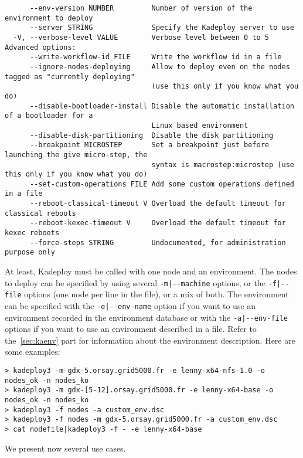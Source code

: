 \documentclass[a4wide,10pt,oneside]{book}
\begin{document}
\begin{small}
\begin{verbatim}
      --env-version NUMBER         Number of version of the environment to deploy
      --server STRING              Specify the Kadeploy server to use
  -V, --verbose-level VALUE        Verbose level between 0 to 5
Advanced options:
      --write-workflow-id FILE     Write the workflow id in a file
      --ignore-nodes-deploying     Allow to deploy even on the nodes tagged as "currently deploying"
                                   (use this only if you know what you do)
      --disable-bootloader-install Disable the automatic installation of a bootloader for a
                                   Linux based environment
      --disable-disk-partitioning  Disable the disk partitioning
      --breakpoint MICROSTEP       Set a breakpoint just before launching the give micro-step, the
                                   syntax is macrostep:microstep (use this only if you know what you do)
      --set-custom-operations FILE Add some custom operations defined in a file
      --reboot-classical-timeout V Overload the default timeout for classical reboots
      --reboot-kexec-timeout V     Overload the default timeout for kexec reboots
      --force-steps STRING         Undocumented, for administration purpose only

\end{verbatim}
\end{small}

At least, Kadeploy must be called with one node and an environment. The nodes to deploy can be specified by using several \texttt{-m|-{}-machine} options, or the \texttt{-f|-{}-file} options (one node per line in the file), or a mix of both.
The environment can be specified with the \texttt{-e|-{}-env-name} option if you want to use an environment recorded in the environment database or with the \texttt{-a|-{}-env-file} options if you want to use an environment described in a file. Refer to the~\ref{sec:kaenv} part for information about the environment description. Here are some examples:
\begin{verbatim}
> kadeploy3 -m gdx-5.orsay.grid5000.fr -e lenny-x64-nfs-1.0 -o nodes_ok -n nodes_ko
> kadeploy3 -m gdx-[5-12].orsay.grid5000.fr -e lenny-x64-base -o nodes_ok -n nodes_ko
> kadeploy3 -f nodes -a custom_env.dsc
> kadeploy3 -f nodes -m gdx-5.orsay.grid5000.fr -a custom_env.dsc
> cat nodefile|kadeploy3 -f - -e lenny-x64-base
\end{verbatim}

We present now several use cases.
\end{document}
